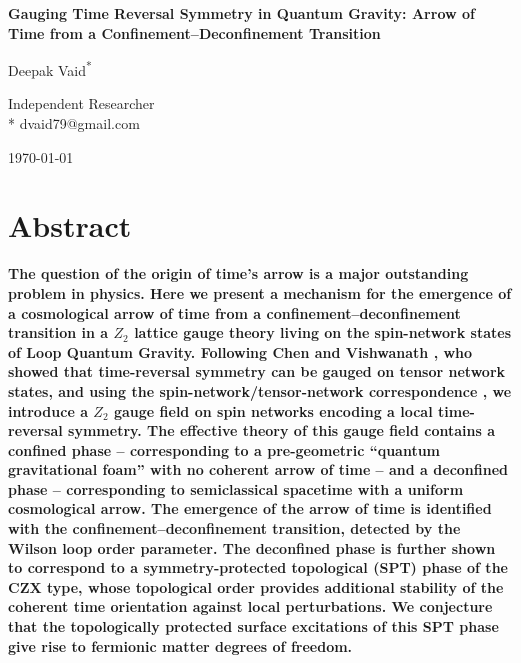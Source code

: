 \documentclass[preprint]{SciPost}
\theoremstyle{plain} %
\begin{document}

\begin{center}{\Large \textbf{
Gauging Time Reversal Symmetry in Quantum Gravity: Arrow of Time from a Confinement--Deconfinement Transition
}}\end{center}

\begin{center}
Deepak Vaid\textsuperscript{*}
\end{center}

\begin{center}
Independent Researcher
\\
* dvaid79@gmail.com
\end{center}

\begin{center}
\today
\end{center}


\section*{Abstract}
{\bf
The question of the origin of time's arrow is a major outstanding problem in physics. Here we present a mechanism for the emergence of a cosmological arrow of time from a confinement--deconfinement transition in a $ Z_2 $ lattice gauge theory living on the spin-network states of Loop Quantum Gravity. Following Chen and Vishwanath \cite{Chen2015Gauging}, who showed that time-reversal symmetry can be gauged on tensor network states, and using the spin-network/tensor-network correspondence \cite{Qi2013Exact,Han2016Loop}, we introduce a $ Z_2 $ gauge field on spin networks encoding a local time-reversal symmetry. The effective theory of this gauge field contains a confined phase -- corresponding to a pre-geometric ``quantum gravitational foam'' with no coherent arrow of time -- and a deconfined phase -- corresponding to semiclassical spacetime with a uniform cosmological arrow. The emergence of the arrow of time is identified with the confinement--deconfinement transition, detected by the Wilson loop order parameter. The deconfined phase is further shown to correspond to a symmetry-protected topological (SPT) phase of the CZX type, whose topological order provides additional stability of the coherent time orientation against local perturbations. We conjecture that the topologically protected surface excitations of this SPT phase give rise to fermionic matter degrees of freedom.
}
\end{document}
